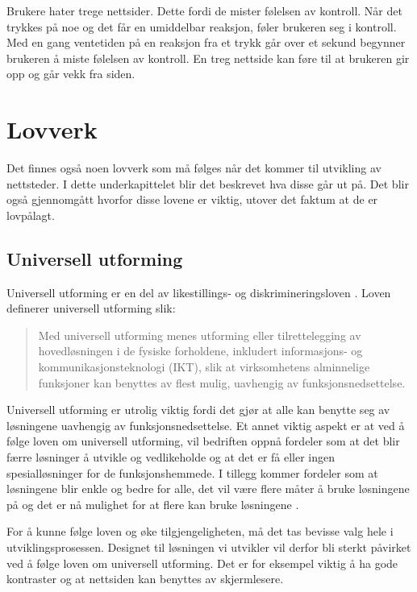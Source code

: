 Brukere hater trege nettsider. Dette fordi de mister følelsen av kontroll. Når det trykkes på noe og det får en umiddelbar reaksjon, føler brukeren seg i kontroll. Med en gang ventetiden på en reaksjon fra et trykk går over et sekund begynner brukeren å miste følelsen av kontroll. En treg nettside kan føre til at brukeren gir opp og går vekk fra siden.


\section{Lovverk}
Det finnes også noen lovverk som må følges når det kommer til utvikling av nettsteder. I dette underkapittelet blir det beskrevet hva disse går ut på. Det blir også gjennomgått hvorfor disse lovene er viktig, utover det faktum at de er lovpålagt. 

\subsection{Universell utforming}
\label{sec:universal-design}
Universell utforming er en del av likestillings- og diskrimineringsloven \cite{lovdata2018fou}. Loven definerer universell utforming slik:

\begin{quote}
    Med universell utforming menes utforming eller tilrettelegging av hovedløsningen i de fysiske forholdene, inkludert informasjons- og kommunikasjonsteknologi (IKT), slik at virksomhetens alminnelige funksjoner kan benyttes av flest mulig, uavhengig av funksjonsnedsettelse.
\end{quote}

Universell utforming er utrolig viktig fordi det gjør at alle kan benytte seg av løsningene uavhengig av funksjonsnedsettelse. Et annet viktig aspekt er at ved å følge loven om universell utforming, vil bedriften oppnå fordeler som at det blir færre løsninger å utvikle og vedlikeholde og at det er få eller ingen spesialløsninger for de funksjonshemmede. I tillegg kommer fordeler som at løsningene blir enkle og bedre for alle, det vil være flere måter å bruke løsningene på og det er nå mulighet for at flere kan bruke løsningene \cite{difi2018keu}.

For å kunne følge loven og øke tilgjengeligheten, må det tas bevisse valg hele i utviklingsprosessen. Designet til løsningen vi utvikler vil derfor bli sterkt påvirket ved å følge loven om universell utforming. Det er for eksempel viktig å ha gode kontraster og at nettsiden kan benyttes av skjermlesere. 



